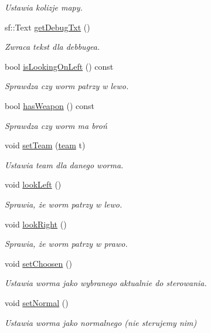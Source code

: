 \begin{DoxyCompactItemize}
\begin{DoxyCompactList}\small\item\em Ustawia kolizje mapy. \end{DoxyCompactList}\item 
sf\+::\+Text \mbox{\hyperlink{class_worm_afed2a8beb878659d49977440293ef884}{get\+Debug\+Txt}} ()
\begin{DoxyCompactList}\small\item\em Zwraca tekst dla debbuge\textquotesingle{}a. \end{DoxyCompactList}\item 
bool \mbox{\hyperlink{class_worm_a3a90a91ddbe99e67f48e54a57d12b5c7}{is\+Looking\+On\+Left}} () const
\begin{DoxyCompactList}\small\item\em Sprawdza czy worm patrzy w lewo. \end{DoxyCompactList}\item 
bool \mbox{\hyperlink{class_worm_a15fc66d733ecfe886495910f591d1a34}{has\+Weapon}} () const
\begin{DoxyCompactList}\small\item\em Sprawdza czy worm ma broń \end{DoxyCompactList}\item 
void \mbox{\hyperlink{class_worm_a8eb6b3e55c2e6cb7c87b1593f34dac52}{set\+Team}} (\mbox{\hyperlink{_worm_8h_ae79581ee1998185d7cb41ab84352b97e}{team}} t)
\begin{DoxyCompactList}\small\item\em Ustawia team dla danego worma. \end{DoxyCompactList}\item 
void \mbox{\hyperlink{class_worm_a84fbbdac67be083a5492bf38cf83544b}{look\+Left}} ()
\begin{DoxyCompactList}\small\item\em Sprawia, że worm patrzy w lewo. \end{DoxyCompactList}\item 
void \mbox{\hyperlink{class_worm_a4dbc714c26c5b09a94bd53f10172b4c1}{look\+Right}} ()
\begin{DoxyCompactList}\small\item\em Sprawia, że worm patrzy w prawo. \end{DoxyCompactList}\item 
void \mbox{\hyperlink{class_worm_ac5daf6e0926f483415886c5ae297714a}{set\+Choosen}} ()
\begin{DoxyCompactList}\small\item\em Ustawia worma jako wybranego aktualnie do sterowania. \end{DoxyCompactList}\item 
void \mbox{\hyperlink{class_worm_ab316cd13ecdfe9696e28687bfce47a4c}{set\+Normal}} ()
\begin{DoxyCompactList}\small\item\em Ustawia worma jako normalnego (nie sterujemy nim) \end{DoxyCompactList}\end{DoxyCompactItemize}

